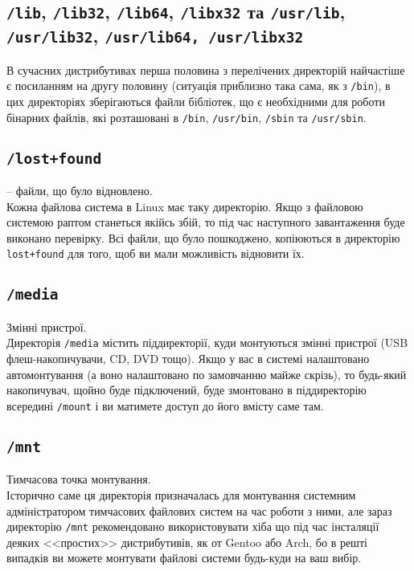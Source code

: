 \documentclass[10pt,a4paper]{fancyhandout}
\begin{document}
	\subsection{\texttt{/lib}, \texttt{/lib32}, \texttt{/lib64}, \texttt{/libx32} та \texttt{/usr/lib}, \texttt{/usr/lib32}, \texttt{/usr/lib64, \texttt{/usr/libx32}}}
	В сучасних дистрибутивах перша половина з перелічених директорій найчастіше є посиланням на другу половину (ситуація приблизно така сама, як з \texttt{/bin}), в цих директоріях зберігаються файли бібліотек, що є необхідними для роботи бінарних файлів, які розташовані в \texttt{/bin}, \texttt{/usr/bin}, \texttt{/sbin} та \texttt{/usr/sbin}.
	\goodbreak
	
	\subsection{\texttt{/lost+found}} -- файли, що було відновлено. \\
	Кожна файлова система в Linux має таку директорію. Якщо з файловою системою раптом станеться якійсь збій, то під час наступного завантаження буде виконано перевірку. Всі файли, що було пошкоджено, копіюються в директорію \texttt{lost+found} для того, щоб ви мали можливість відновити їх.
	\goodbreak
	
	\subsection{\texttt{/media}}
	Змінні пристрої. \\
	Директорія \texttt{/media} містить піддиректорії, куди монтуються змінні пристрої (USB флеш-накопичувачи, CD, DVD тощо). Якщо у вас в системі налаштовано автомонтування (а воно налаштовано по замовчанню майже скрізь), то будь-який накопичувач, щойно буде підключений, буде змонтовано в піддиректорію всередині \texttt{/mount} і ви матимете доступ до його вмісту саме там.
	\goodbreak
	
	\subsection{\texttt{/mnt}}
	Тимчасова точка монтування. \\
	Історично саме ця директорія призначалась для монтування системним адміністратором тимчасових файлових систем на час роботи з ними, але зараз директорію \texttt{/mnt} рекомендовано використовувати хіба що під час інсталяції деяких <<простих>> дистрибутивів, як от Gentoo або Arch, бо в решті випадків ви можете монтувати файлові системи будь-куди на ваш вибір.
	\goodbreak
	
\end{document}
